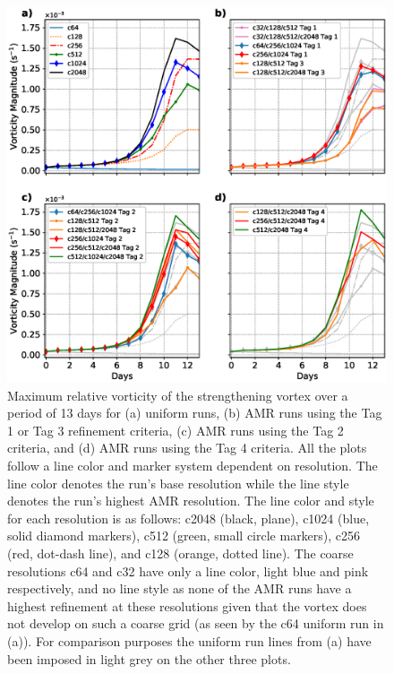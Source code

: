 \documentclass{ametsoc}
\begin{document}
\begin{figure}
   \centerline{%
   \noindent
   \includegraphics[width=\textwidth]{Figures/vortmax_lineplot.eps}}
   \caption{Maximum relative vorticity of the strengthening vortex over a 
   period of 13 days for (a) uniform runs, (b) AMR runs using the Tag 1 or
   Tag 3 refinement criteria, (c) AMR runs using the Tag 2 criteria, and (d)
   AMR runs using the Tag 4 criteria. All the plots follow a line color and marker
   system dependent on resolution. The line color denotes the run's base resolution
   while the line style denotes the run's highest AMR resolution. The line color and
   style for each resolution is as follows: c2048 (black, plane), c1024 (blue, solid diamond markers),
   c512 (green, small circle markers), c256 (red, dot-dash line), and c128 (orange, dotted line).
   The coarse resolutions c64 and c32 have only a line color, light blue and pink respectively, and
   no line style as none of the AMR runs have a highest refinement at these resolutions given that
   the vortex does not develop on such a coarse grid (as seen by the c64 uniform run in (a)).
   For comparison purposes the uniform run lines from (a) have been imposed in light grey on
   the other three plots.
   }
   \label{fig:vort_lineplot}
\end{figure}
\end{document}
